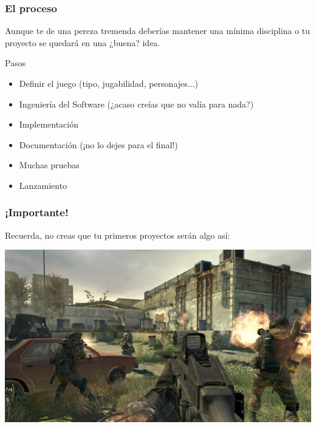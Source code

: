 \documentclass{beamer}
\begin{document}
\begin{frame}
	\frametitle{El proceso}
	
	Aunque te de una pereza tremenda deberías mantener una mínima
	disciplina o tu proyecto se quedará en una ¿buena? idea.
		
	\begin{block}{Pasos}
		\begin{itemize}
			\item Definir el juego (tipo, jugabilidad, personajes...)
			\item Ingeniería del Software (¿acaso creías que no valía para nada?)
			\item Implementación
			\item Documentación (¡no lo dejes para el final!)
			\item Muchas pruebas
			\item Lanzamiento
		\end{itemize}            
	\end{block}        
	
\end{frame}

\begin{frame}
	\frametitle{¡Importante!}
	
	\begin{center}
		Recuerda, no creas que tu primeros proyectos serán algo así:
	\end{center}	
	
	\begin{center}
		\includegraphics[scale=0.2]{img/codmw2.jpg}
	\end{center}	
\end{frame}
\end{document}
